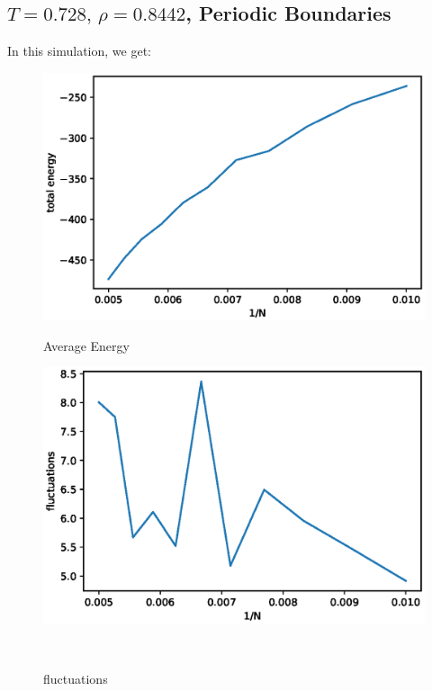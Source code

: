 \documentclass[UTF8,a4paper]{article}
\begin{document}
\subsection{$T =0.728,\, \rho = 0.8442$, Periodic Boundaries}
In this simulation, we get:
\begin{figure}[H]
	\centering
	\begin{minipage}[t]{0.45\textwidth}
		\centering
		\includegraphics[height=0.2\textheight]{fig/sc_exp1_e.eps}
		\caption{Average Energy}
	\end{minipage}\hspace{0.5cm}
	\begin{minipage}[t]{0.45\textwidth}
		\centering
		\includegraphics[height=0.2\textheight]{fig/sc_exp1_p.eps}
		\caption{fluctuations}
	\end{minipage}\\
	\begin{minipage}[t]{0.6\textwidth}

\end{minipage}
\end{figure}
\end{document}

